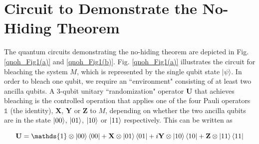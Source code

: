 \section{Circuit to Demonstrate the No-Hiding Theorem}

The quantum circuits demonstrating the no-hiding theorem are depicted in Fig. \ref{qnoh_Fig1(a)} and \ref{qnoh_Fig1(b)}. Fig. \ref{qnoh_Fig1(a)} illustrates the circuit for bleaching the system $M$, which is represented by the single qubit state $|\psi\rangle$. In order to bleach one qubit, we require an ``environment" consisting of at least two ancilla qubits. A 3-qubit unitary ``randomization" operator $\mathbf{U}$ that achieves bleaching is the controlled operation that applies one of the four Pauli operators  $\mathds{1}$ (the identity), $\mathbf{X}$, $\mathbf{Y}$ or $\mathbf{Z}$ to $M$, depending on whether the two ancilla qubits are in the state $\ket{00}$, $\ket{01}$, $\ket{10}$ or $\ket{11}$ respectively. This can be written as

\begin{equation}\label{qnoh_Eq1}
    \mathbf{U} =  \mathds{1} \otimes \ket{00}\bra{00} + \mathbf{X} \otimes \ket{01}\bra{01} + i \mathbf{Y}\otimes \ket{10}\bra{10}+\mathbf{Z}\otimes \ket{11}\bra{11}
\end{equation}

